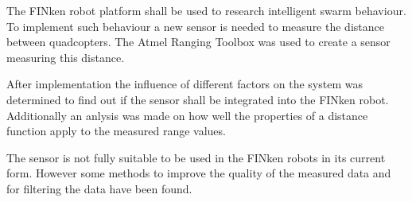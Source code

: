 
The FINken robot platform shall be used to research intelligent swarm behaviour.
To implement such behaviour a new sensor is needed to measure the distance between quadcopters.
The Atmel Ranging Toolbox was used to create a sensor measuring this distance.

After implementation the influence of different factors on the system was determined to find out if the sensor shall be integrated into the FINken robot.
Additionally an anlysis was made on how well the properties of a distance function apply to the measured range values.

The sensor is not fully suitable to be used in the FINken robots in its current form.
However some methods to improve the quality of the measured data and for filtering the data have been found.
